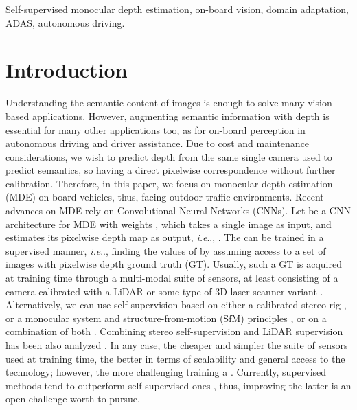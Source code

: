\documentclass[journal]{IEEEtran}
\makeatletter
\DeclareRobustCommand\onedot{\futurelet\@let@token\@onedot}
\def\@onedot{\ifx\@let@token.\else.\null\fi\xspace}
\def\ie{\emph{i.e}\onedot} \def\Ie{\emph{I.e}\onedot}
\makeatother
\begin{document}
\begin{IEEEkeywords}
Self-supervised monocular depth estimation, on-board vision, domain adaptation, ADAS, autonomous driving.
\end{IEEEkeywords}

\section{Introduction}

Understanding the semantic content of images is enough to solve many vision-based applications. However, augmenting semantic information with depth is essential for many other applications too, as for on-board perception in autonomous driving and driver assistance. Due to cost and maintenance considerations, we wish to predict depth from the same single camera used to predict semantics, so having a direct pixelwise correspondence without further calibration. Therefore, in this paper, we focus on monocular depth estimation (MDE) on-board vehicles, thus, facing outdoor traffic environments. Recent advances on MDE rely on Convolutional Neural Networks (CNNs). Let  be a CNN architecture for MDE with weights , which takes a single image  as input, and estimates its pixelwise depth map  as output, {\ie}, . The  can be trained in a supervised manner, {\ie}, finding the values of  by assuming access to a set of images with pixelwise depth ground truth (GT). Usually, such a GT is acquired at training time through a multi-modal suite of sensors, at least consisting of a camera calibrated with a LiDAR or some type of 3D laser scanner variant \cite{Eigen:2014, Liu:2016, Roy:2016, Laina:2016, Cao:2017, Fu:2018DORN, Gurram:2018, He:2018, Xu:2018, Yin:2019}. Alternatively, we can use self-supervision based on either a calibrated stereo rig \cite{Saxena:2007, Garg:2016, Godard:2017, Pillai:2019}, or a monocular system and structure-from-motion (SfM) principles \cite{Zhou:2017, Yin:2018GeoNet, Zhao:2020, Guizilini:20203D}, or on a combination of both \cite{Godard:2019MonoDepth2}. Combining stereo self-supervision and LiDAR supervision has been also analyzed \cite{Kuznietsov:2017, He:2018wearable, Guizilini:2020}. In any case, the cheaper and simpler the suite of sensors used at training time, the better in terms of scalability and general access to the technology; however, the more challenging training a . Currently, supervised methods tend to outperform self-supervised ones \cite{De:2021},
thus, improving the latter is an open challenge worth to pursue.   
\end{document}
